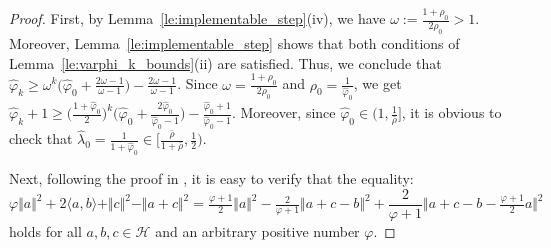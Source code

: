 \documentclass{article}
\theoremstyle{plain}
\theoremstyle{definition}
\newcommand{\norms}[1]{\Vert#1\Vert}
\newcommand{\iprods}[1]{\langle #1\rangle}
\newcommand{\0}{\boldsymbol{0}}
\begin{document}
\begin{proof}
First, by Lemma~\ref{le:implementable_step}(iv), we have $\omega := \frac{1 + \rho_0}{2\rho_0} > 1$.
Moreover, Lemma~\ref{le:implementable_step} shows that both conditions of Lemma~\ref{le:varphi_k_bounds}(ii) are satisfied.
Thus, we conclude that $\hat{\varphi}_k \geq \omega^k\big(\hat{\varphi}_0 + \frac{2\omega-1}{\omega-1}\big) -  \frac{2\omega-1}{\omega - 1}$.
Since $\omega = \frac{1 + \rho_0}{2\rho_0}$ and $\rho_0 = \frac{1}{\hat{\varphi}_0}$, we get $\hat{\varphi}_k + 1 \geq \big( \frac{1 + \hat{\varphi}_0}{2} \big)^k\big(\hat{\varphi}_0 + \frac{2\hat{\varphi}_0}{\hat{\varphi}_0-1}\big) - \frac{\hat{\varphi}_0 + 1}{\hat{\varphi}_0 - 1}$.
Moreover, since $\hat{\varphi}_0 \in \big(1, \frac{1}{ \bar{\rho} }\big]$, it is obvious to check that $\hat{\lambda}_0 = \frac{1}{1 + \hat{\varphi}_0} \in \big[\frac{\bar{\rho}}{1 + \bar{\rho}}, \frac{1}{2}\big)$.

Next, following the proof in \cite[Theorem 3.2]{he2024convergence}, it is easy to verify that the equality:
\begin{equation*} 
\varphi \norms{a}^2 + 2\iprods{a, b} + \norms{ c }^2 -\norms{a + c}^2 = \tfrac{\varphi+1}{2}\norms{ a}^2 - \tfrac{2}{\varphi+1}\norms{a + c - b}^2 + \frac{2}{\varphi+1}\norms{ a + c - b - \tfrac{\varphi+1}{2}a}^2
\end{equation*}
holds for all $a, b, c \in \mathcal{H}$ and an arbitrary positive number $\varphi$. 


\end{proof}
\end{document}
